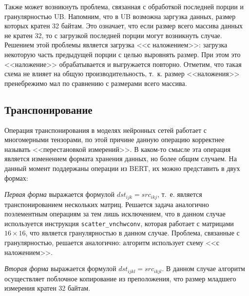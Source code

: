 Также может возникнуть проблема, связанная с обработкой последней порции и
гранулярностью UB. Напомним, что в UB возможна заргузка данных, размер которых
кратен 32 байтам. Это означает, что если размер всего массива данных не кратен
32, то с загрузкой последней порции могут возникнуть случае. Решением этой
проблемы является загрузка <<с наложением>>: загрузка некоторую часть предыдущей
порции с целью выровнять размер. При этом это <<наложение>> обрабатывается и
выгружается повторно. Отметим, что такая схема не влияет на общую
производительность, т.~к. размер <<наложения>> пренебрежимо мал по сравнению
с размерами всего массива.

\subsection{Транспонирование}

Операция транспонирования в моделях нейронных сетей работает с многомерными
тензорами, по этой причине данную операцию корректнее называть <<перестановкой
измерений>>. В каком-то смысле эта операция является изменением формата хранения
данных, но более общим случаем. На данный момент поддержаны операции из BERT,
их можно представить в двух формах:

\textit{Первая форма} выражается формулой $dst_{ijk} = src_{ikj}$, т.~е.
является транспонированием нескольких матриц. Решается задача аналогично
поэлементным операциям за тем лишь исключением, что в данном случае используется
инструкция \texttt{scatter\_vnchwconv}, которая работает с матрицами
$16 \times 16$, что является гранулярностью в данном случае. Проблема, связанные
с гранулярностью, решается аналогично: алгоритм использует схему <<с наложением>>.

\textit{Вторая форма} выражается формулой $dst_{ijkl} = src_{ikjl}$. В данном
случае алгоритм осуществляет поблочное копирование из преположения, что размер
младшего измерения кратен 32 байтам.

